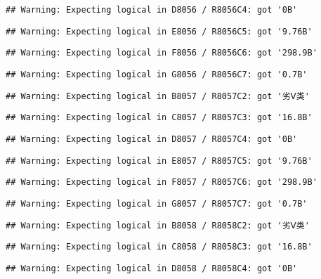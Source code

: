 \documentclass[
]{article}
\begin{document}
\begin{verbatim}
## Warning: Expecting logical in D8056 / R8056C4: got '0B'
\end{verbatim}

\begin{verbatim}
## Warning: Expecting logical in E8056 / R8056C5: got '9.76B'
\end{verbatim}

\begin{verbatim}
## Warning: Expecting logical in F8056 / R8056C6: got '298.9B'
\end{verbatim}

\begin{verbatim}
## Warning: Expecting logical in G8056 / R8056C7: got '0.7B'
\end{verbatim}

\begin{verbatim}
## Warning: Expecting logical in B8057 / R8057C2: got '劣Ⅴ类'
\end{verbatim}

\begin{verbatim}
## Warning: Expecting logical in C8057 / R8057C3: got '16.8B'
\end{verbatim}

\begin{verbatim}
## Warning: Expecting logical in D8057 / R8057C4: got '0B'
\end{verbatim}

\begin{verbatim}
## Warning: Expecting logical in E8057 / R8057C5: got '9.76B'
\end{verbatim}

\begin{verbatim}
## Warning: Expecting logical in F8057 / R8057C6: got '298.9B'
\end{verbatim}

\begin{verbatim}
## Warning: Expecting logical in G8057 / R8057C7: got '0.7B'
\end{verbatim}

\begin{verbatim}
## Warning: Expecting logical in B8058 / R8058C2: got '劣Ⅴ类'
\end{verbatim}

\begin{verbatim}
## Warning: Expecting logical in C8058 / R8058C3: got '16.8B'
\end{verbatim}

\begin{verbatim}
## Warning: Expecting logical in D8058 / R8058C4: got '0B'
\end{verbatim}
\end{document}

